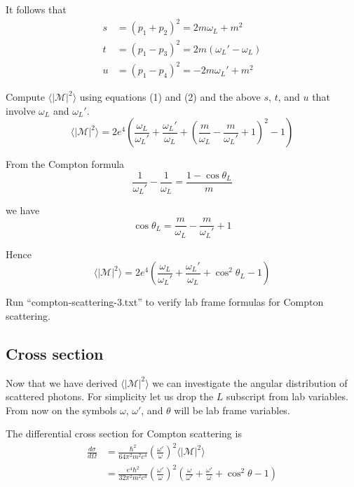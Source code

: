 \documentclass[12pt]{article}
\begin{document}
\noindent
It follows that
\begin{equation*}
\begin{aligned}
s&=(p_1+p_2)^2=2m\omega_L+m^2
\\
t&=(p_1-p_3)^2=2m(\omega_L' - \omega_L)
\\
u&=(p_1-p_4)^2=-2 m \omega_L' + m^2
\end{aligned}
\end{equation*}

\noindent
Compute $\langle|\mathcal{M}|^2\rangle$ using equations (1) and (2)
and the above $s$, $t$, and $u$ that involve $\omega_L$ and $\omega_L'$.
\begin{equation*}
\langle|\mathcal{M}|^2\rangle=
2e^4\left(
\frac{\omega_L}{\omega_L'}+\frac{\omega_L'}{\omega_L}
+\left(\frac{m}{\omega_L}-\frac{m}{\omega_L'}+1\right)^2-1
\right)
\end{equation*}

\noindent
From the Compton formula
\begin{equation*}
\frac{1}{\omega_L'}-\frac{1}{\omega_L}=\frac{1-\cos\theta_L}{m}
\end{equation*}

\noindent
we have
\begin{equation*}
\cos\theta_L=\frac{m}{\omega_L}-\frac{m}{\omega_L'}+1
\end{equation*}

\noindent
Hence
\begin{equation*}
\langle|\mathcal{M}|^2\rangle=
2e^4\left(
\frac{\omega_L}{\omega_L'}+\frac{\omega_L'}{\omega_L}+\cos^2\theta_L-1
\right)
\end{equation*}

\noindent
Run ``compton-scattering-3.txt'' to verify lab frame formulas for Compton scattering.

\subsection*{Cross section}
Now that we have derived $\langle|\mathcal{M}|^2\rangle$
we can investigate the angular distribution of scattered photons.
For simplicity let us drop the $L$ subscript from lab variables.
From now on the symbols $\omega$, $\omega'$, and $\theta$ will be lab frame variables.

\bigskip
\noindent
The differential cross section for Compton scattering is
\begin{align*}
\frac{d\sigma}{d\Omega}&=\frac{\hbar^2}{64\pi^2m^2c^4}
\left(\frac{\omega'}{\omega}\right)^2\langle|\mathcal{M}|^2\rangle
\\
&=\frac{e^4\hbar^2}{32\pi^2m^2c^4}
\left(\frac{\omega'}{\omega}\right)^2
\left(
\frac{\omega}{\omega'}+\frac{\omega'}{\omega}+\cos^2\theta-1
\right)
\end{align*}
\end{document}
